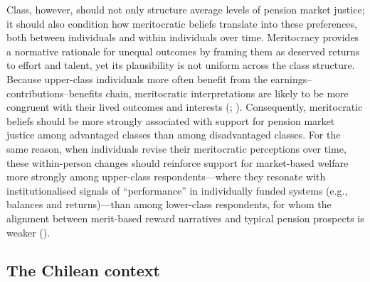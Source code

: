\documentclass[
  12pt,
]{article}
\begin{document}
Class, however, should not only structure average levels of pension
market justice; it should also condition how meritocratic beliefs
translate into these preferences, both between individuals and within
individuals over time. Meritocracy provides a normative rationale for
unequal outcomes by framing them as deserved returns to effort and
talent, yet its plausibility is not uniform across the class structure.
Because upper-class individuals more often benefit from the
earnings--contributions--benefits chain, meritocratic interpretations
are likely to be more congruent with their lived outcomes and interests
(;
). Consequently,
meritocratic beliefs should be more strongly associated with support for
pension market justice among advantaged classes than among disadvantaged
classes. For the same reason, when individuals revise their meritocratic
perceptions over time, these within-person changes should reinforce
support for market-based welfare more strongly among upper-class
respondents---where they resonate with institutionalised signals of
``performance'' in individually funded systems (e.g., balances and
returns)---than among lower-class respondents, for whom the alignment
between merit-based reward narratives and typical pension prospects is
weaker ().

\subsection{The Chilean context}\label{the-chilean-context}
\end{document}

